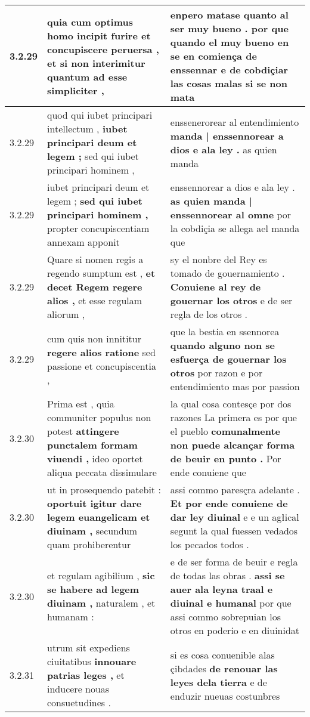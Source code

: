 \begin{tabular}{|p{1cm}|p{6.5cm}|p{6.5cm}|}
3.2.29 & quia cum optimus homo incipit furire \textbf{ et concupiscere peruersa , } et si non interimitur quantum ad esse simpliciter , & enpero matase quanto al ser muy bueno . \textbf{ por que quando el muy bueno en se en comiença de enssennar e de cobdiçiar las cosas malas } si se non mata \\\hline
3.2.29 & quod qui iubet principari intellectum , \textbf{ iubet principari deum et legem ; } sed qui iubet principari hominem , & enssenerorear al entendimiento \textbf{ manda | enssennorear a dios e ala ley . } as quien manda \\\hline
3.2.29 & iubet principari deum et legem ; \textbf{ sed qui iubet principari hominem , } propter concupiscentiam annexam apponit & enssennorear a dios e ala ley . \textbf{ as quien manda | enssennorear al omne } por la cobdiçia se allega ael manda que \\\hline
3.2.29 & Quare si nomen regis a regendo sumptum est , \textbf{ et decet Regem regere alios , } et esse regulam aliorum , & sy el nonbre del Rey es tomado de gouernamiento . \textbf{ Conuiene al rey de gouernar los otros } e de ser regla de los otros . \\\hline
3.2.29 & cum quis non innititur \textbf{ regere alios ratione } sed passione et concupiscentia , & que la bestia en ssennorea \textbf{ quando alguno non se esfuerça de gouernar los otros } por razon e por entendimiento mas por passion \\\hline
3.2.30 & Prima est , quia communiter populus non potest \textbf{ attingere punctalem formam viuendi , } ideo oportet aliqua peccata dissimulare & la qual cosa contesçe por dos razones La primera es por que el pueblo \textbf{ comunalmente non puede alcançar forma de beuir en punto . } Por ende conuiene que \\\hline
3.2.30 & ut in prosequendo patebit : \textbf{ oportuit igitur dare legem euangelicam et diuinam , } secundum quam prohiberentur & assi commo paresçra adelante . \textbf{ Et por ende conuiene de dar ley diuinal } e e un agłical segunt la qual fuessen vedados los pecados todos . \\\hline
3.2.30 & et regulam agibilium , \textbf{ sic se habere ad legem diuinam , } naturalem , et humanam : & e de ser forma de beuir e regla de todas las obras . \textbf{ assi se auer ala leyna traal e diuinal e humanal } por que assi commo sobrepuian los otros en poderio e en diuinidat \\\hline
3.2.31 & utrum sit expediens ciuitatibus \textbf{ innouare patrias leges , } et inducere nouas consuetudines . & si es cosa conuenible alas çibdades \textbf{ de renouar las leyes dela tierra } e de enduzir nueuas costunbres \\\hline

\end{tabular}
